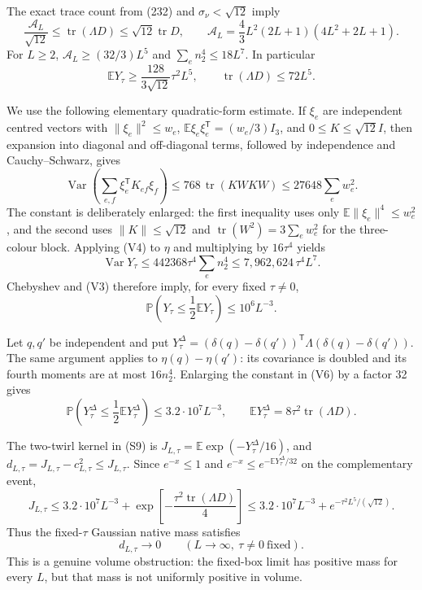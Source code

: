 \documentclass[
  11pt,
]{article}
\begin{document}
The exact trace count from (232) and \(\sigma_\nu<\sqrt{12}\) imply \[
 \frac{\mathcal A_L}{\sqrt{12}}\le \operatorname{tr}(\Lambda D)
 \le\sqrt{12}\operatorname{tr}D,
 \qquad
 \mathcal A_L=\frac{4}{3}L^2(2L+1)(4L^2+2L+1). \tag{V2}
\] For \(L\ge2\), \(\mathcal A_L\ge(32/3)L^5\) and
\(\sum_e n_2^4\le18L^7\). In particular \[
 \mathbb E Y_\tau\ge \frac{128}{3\sqrt{12}}\tau^2L^5,
 \qquad \operatorname{tr}(\Lambda D)\le72L^5. \tag{V3}
\]

We use the following elementary quadratic-form estimate. If \(\xi_e\)
are independent centred vectors with \(\|\xi_e\|^2\le w_e\),
\(\mathbb E\xi_e\xi_e^{\mathsf T}=(w_e/3)I_3\), and
\(0\le K\le\sqrt{12}I\), then expansion into diagonal and off-diagonal
terms, followed by independence and Cauchy--Schwarz, gives \[
 \operatorname{Var}(\sum_{e,f}\xi_e^{\mathsf T}K_{ef}\xi_f)
 \le 768\,\operatorname{tr}(K W K W)
 \le 27648\sum_e w_e^2. \tag{V4}
\] The constant is deliberately enlarged: the first inequality uses only
\(\mathbb E\|\xi_e\|^4\le w_e^2\), and the second uses
\(\|K\|\le\sqrt{12}\) and \(\operatorname{tr}(W^2)=3\sum_e w_e^2\) for
the three-colour block. Applying (V4) to \(\eta\) and multiplying by
\(16\tau^4\) yields \[
 \operatorname{Var}Y_\tau\le 442368\tau^4\sum_e n_2^4
 \le 7{,}962{,}624\,\tau^4L^7. \tag{V5}
\] Chebyshev and (V3) therefore imply, for every fixed \(\tau\ne0\), \[
 \mathbb P\left(Y_\tau\le \frac{1}{2}\mathbb EY_\tau\right)
 \le 10^6L^{-3}. \tag{V6}
\]

Let \(q,q'\) be independent and put
\(Y_\tau^\Delta=(\delta(q)-\delta(q'))^{\mathsf T}\Lambda(\delta(q)-\delta(q'))\).
The same argument applies to \(\eta(q)-\eta(q')\): its covariance is
doubled and its fourth moments are at most \(16n_2^4\). Enlarging the
constant in (V6) by a factor 32 gives \[
 \mathbb P\left(Y_\tau^\Delta\le \frac{1}{2}\mathbb E Y_\tau^\Delta\right)
 \le 3.2\cdot10^7L^{-3},
 \qquad
 \mathbb E Y_\tau^\Delta=8\tau^2\operatorname{tr}(\Lambda D). \tag{V7}
\]

The two-twirl kernel in (S9) is
\(J_{L,\tau}=\mathbb E\exp(-Y_\tau^\Delta/16)\), and
\(d_{L,\tau}=J_{L,\tau}-c_{L,\tau}^2\le J_{L,\tau}\). Since
\(e^{-x}\le1\) and \(e^{-x}\le e^{-\mathbb EY_\tau^\Delta/32}\) on the
complementary event, \[
 J_{L,\tau}
 \le 3.2\cdot10^7L^{-3}
   +\exp\!\left[-\frac{\tau^2\operatorname{tr}(\Lambda D)}{4}\right]
 \le 3.2\cdot10^7L^{-3}+e^{-\tau^2L^5/(\sqrt{12})}. \tag{V8}
\] Thus the fixed-\(\tau\) Gaussian native mass satisfies \[
 d_{L,\tau}\longrightarrow0\qquad(L\to\infty,\ \tau\ne0\ \text{fixed}). \tag{V9}
\] This is a genuine volume obstruction: the fixed-box limit has
positive mass for every \(L\), but that mass is not uniformly positive
in volume.
\end{document}
